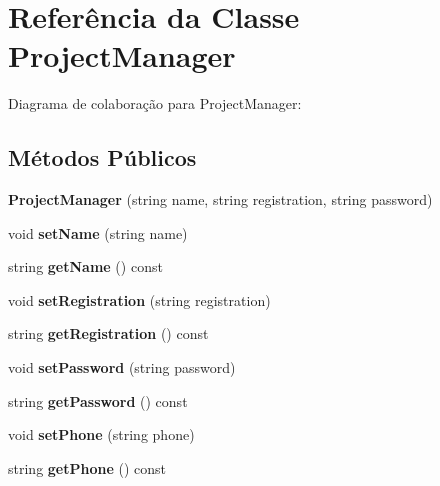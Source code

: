 \hypertarget{classProjectManager}{}\section{Referência da Classe Project\+Manager}
\label{classProjectManager}


Diagrama de colaboração para Project\+Manager\+:
\subsection*{Métodos Públicos}
\begin{DoxyCompactItemize}
\item 
{\bfseries Project\+Manager} (string name, string registration, string password)\hypertarget{classProjectManager_a6857db057510bf51f90b2bb35a096e94}{}\label{classProjectManager_a6857db057510bf51f90b2bb35a096e94}

\item 
void {\bfseries set\+Name} (string name)\hypertarget{classProjectManager_a3854967ff1c96c035d1c08ec75a2fc7a}{}\label{classProjectManager_a3854967ff1c96c035d1c08ec75a2fc7a}

\item 
string {\bfseries get\+Name} () const \hypertarget{classProjectManager_aa2947d8595e4a5afb16d96b622ad5041}{}\label{classProjectManager_aa2947d8595e4a5afb16d96b622ad5041}

\item 
void {\bfseries set\+Registration} (string registration)\hypertarget{classProjectManager_ab0bf8202266254e40efe8e836cffee32}{}\label{classProjectManager_ab0bf8202266254e40efe8e836cffee32}

\item 
string {\bfseries get\+Registration} () const \hypertarget{classProjectManager_a63ca8130e946c22baabf44fe5305c166}{}\label{classProjectManager_a63ca8130e946c22baabf44fe5305c166}

\item 
void {\bfseries set\+Password} (string password)\hypertarget{classProjectManager_a5259b24cca9da21e74c731c4c66b64ca}{}\label{classProjectManager_a5259b24cca9da21e74c731c4c66b64ca}

\item 
string {\bfseries get\+Password} () const \hypertarget{classProjectManager_afa7fbcff78d971eb39b792a754ce1ed7}{}\label{classProjectManager_afa7fbcff78d971eb39b792a754ce1ed7}

\item 
void {\bfseries set\+Phone} (string phone)\hypertarget{classProjectManager_ad4c9b1e5fb91bba5fd4496574f6c3cf9}{}\label{classProjectManager_ad4c9b1e5fb91bba5fd4496574f6c3cf9}

\item 
string {\bfseries get\+Phone} () const \hypertarget{classProjectManager_a85131885310c6e3eaf089865b45e0e92}{}\label{classProjectManager_a85131885310c6e3eaf089865b45e0e92}

\end{DoxyCompactItemize}
